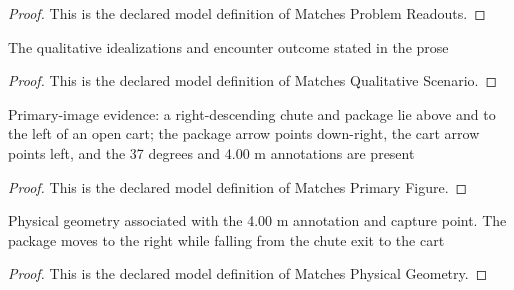 \begin{proof}
  This is the declared model definition of Matches Problem Readouts.
\end{proof}
\begin{definition}
  \label{def:physics:phyx-mini-0768:phyxminiproblems-problemphyxmini0768-matchesqualitativescenario}
  The qualitative idealizations and encounter outcome stated in the prose
\end{definition}
\begin{proof}
  This is the declared model definition of Matches Qualitative Scenario.
\end{proof}
\begin{definition}
  \label{def:physics:phyx-mini-0768:phyxminiproblems-problemphyxmini0768-matchesprimaryfigure}
  Primary-image evidence: a right-descending chute and package lie above and to the left of an open cart; the package arrow points down-right, the cart arrow points left, and the 37 degrees and 4.00 m annotations are present
\end{definition}
\begin{proof}
  This is the declared model definition of Matches Primary Figure.
\end{proof}
\begin{definition}
  \label{def:physics:phyx-mini-0768:phyxminiproblems-problemphyxmini0768-matchesphysicalgeometry}
  Physical geometry associated with the 4.00 m annotation and capture point. The package moves to the right while falling from the chute exit to the cart
\end{definition}
\begin{proof}
  This is the declared model definition of Matches Physical Geometry.
\end{proof}
